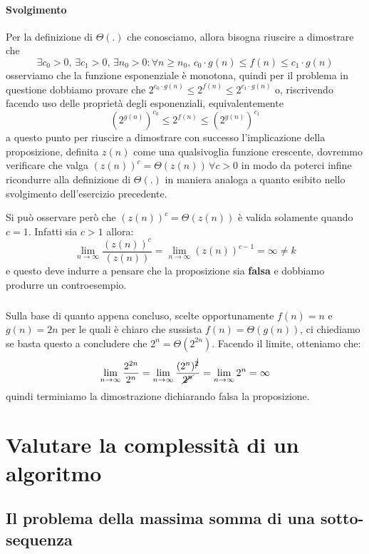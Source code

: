 \documentclass[11pt,a4paper,oneside]{article}
\begin{document}
\paragraph*{Svolgimento} Per la definizione di $\Theta(.)$ che conosciamo, allora bisogna riuscire a dimostrare che $$\exists c_0 > 0,\,\exists c_1 > 0,\,\exists n_0 > 0:\forall n \geq n_0,\,c_0 \cdot g(n) \leq f(n) \leq c_1 \cdot g(n)$$ osserviamo che la funzione esponenziale è monotona, quindi per il problema in questione dobbiamo provare che $2^{c_0 \cdot g(n)} \leq 2^{f(n)} \leq 2^{c_1 \cdot g(n)}$ o, riscrivendo facendo uso delle proprietà degli esponenziali, equivalentemente $$\left(2^{g(n)}\right)^{c_0} \leq 2^{f(n)} \leq \left(2^{g(n)}\right)^{c_1}$$
a questo punto per riuscire a dimostrare con successo l'implicazione della proposizione, definita $z(n)$ come una qualsivoglia funzione crescente, dovremmo verificare che valga \linebreak $(z(n))^c = \Theta(z(n))\,\forall c > 0$ in modo da poterci infine ricondurre alla definizione di $\Theta(.)$ in maniera analoga a quanto esibito nello svolgimento dell'esercizio precedente.\\
\begin{tcolorbox}[title=Osservazione]
Si può osservare però che $(z(n))^c = \Theta(z(n))$ è valida solamente quando $c = 1$. Infatti sia $c > 1$ allora: $$\lim_{n \to \infty} \frac{(z(n))^c}{(z(n))} = \lim_{n \to \infty} (z(n))^{c-1} = \infty \neq k$$ e questo deve indurre a pensare che la proposizione sia \textbf{falsa} e dobbiamo produrre un controesempio.
\end{tcolorbox}
\subparagraph*{} Sulla base di quanto appena concluso, scelte opportunamente $f(n) = n$ e $g(n) = 2n$ per le quali è chiaro che sussista $f(n) = \Theta(g(n))$, ci chiediamo se basta questo a concludere che $2^n = \Theta(2^{2n})$. Facendo il limite, otteniamo che: $$\lim_{n \to \infty} \frac{2^{2n}}{2^n} = \lim_{n \to \infty} \frac{(2^n)^{\cancel{2}}}{\cancel{2^n}} = \lim_{n \to \infty} 2^n = \infty$$ quindi terminiamo la dimostrazione dichiarando falsa la proposizione.
\section{Valutare la complessità di un algoritmo}
\subsection{Il problema della massima somma di una sotto-sequenza}
\end{document}
